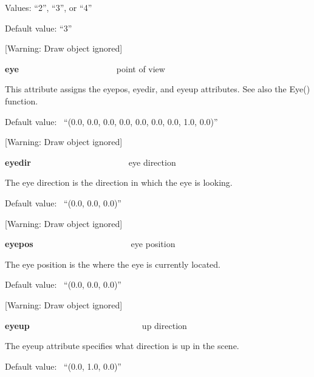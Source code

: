 \documentclass[letterpaper]{article}
\begin{document}
\bigskip

{
Values: \textsf{{}``2''}, \textsf{{}``3''}, or \textsf{{}``4''}}

{
Default value: \textsf{{}``3''}}

[Warning: Draw object ignored]

{
\textsf{\textbf{eye\ \ \ \ \ \ \ \ \ \ \ \ \ \ \ \ \ \ \ \  }}point of view}


\bigskip

{
This attribute assigns the eyepos, eyedir, and eyeup attributes. See also the \textsf{Eye()} function.}


\bigskip

{
Default value: \ \textsf{{}``(0.0, 0.0, 0.0, 0.0, 0.0, 0.0, 0.0, 1.0, 0.0)''}}

[Warning: Draw object ignored]

{
\textsf{\textbf{eyedir\ \ \ \ \ \ \ \ \ \ \ \ \ \ \ \ \ \ \ \ }}eye direction}


\bigskip

{
The eye direction is the direction in which the eye is looking.}


\bigskip

{
Default value: \ \textsf{{}``(0.0, 0.0, 0.0)''}}

[Warning: Draw object ignored]

{
\textsf{\textbf{eyepos\ \ \ \ \ \ \ \ \ \ \ \ \ \ \ \ \ \  \ \ }}eye position}


\bigskip

{
The eye position is the where the eye is currently located. }


\bigskip

{
Default value: \ \textsf{{}``(0.0, 0.0, 0.0)''}}

[Warning: Draw object ignored]

{
\textsf{\textbf{eyeup\ \ \ \ \ \ \ \ \ \ \ \ \ \ \ \ \ \ \ \  \ \ \ }}up direction}


\bigskip

{
The eyeup attribute specifies what direction is up in the scene. }


\bigskip

{
Default value: \ \textsf{{}``(0.0, 1.0, 0.0)''}}
\end{document}
